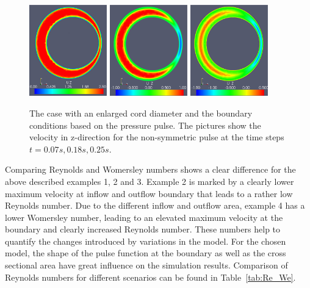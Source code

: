 \begin{figure}
\center
\includegraphics[width=0.3\textwidth]{chapters/hentschel/pdf/pulse_syrinx_f1_08_syrinx05_sysmax_nmb7.pdf}
\includegraphics[width=0.3\textwidth]{chapters/hentschel/pdf/pulse_syrinx_f1_08_syrinx05_sysdia_nmb18.pdf}
\includegraphics[width=0.3\textwidth]{chapters/hentschel/pdf/pulse_syrinx_f1_08_syrinx05_diamin1_nmb25.pdf}
\caption{The case with an enlarged cord diameter and the boundary
    conditions based on the pressure pulse. The pictures show the velocity
    in z-direction for the non-symmetric pulse at the time steps $t=0.07s,
    0.18s, 0.25s$.}
\label{fig:case4}
\end{figure}

Comparing Reynolds and Womersley numbers shows a clear difference for
the above described examples 1, 2 and 3. Example 2 is marked by a
clearly lower maximum velocity at inflow and outflow boundary that
leads to a rather low Reynolds number. Due to the different inflow and
outflow area, example 4 has a lower Womersley number, leading to an
elevated maximum velocity at the boundary and clearly increased
Reynolds number. These numbers help to quantify the changes introduced
by variations in the model. For the chosen model, the shape of the
pulse function at the boundary as well as the cross sectional area
have great influence on the simulation results.
Comparison of Reynolds numbers
for different scenarios can be found in Table~\ref{tab:Re_We}.

